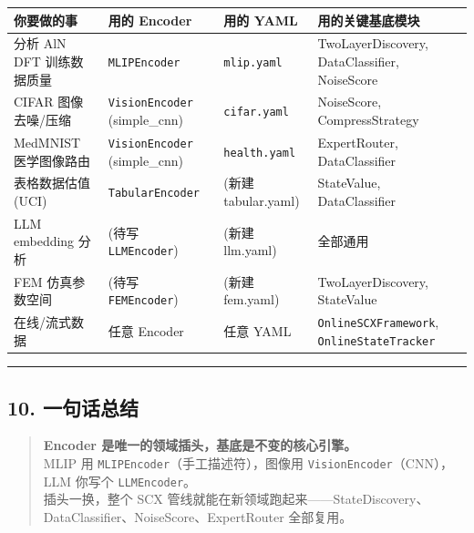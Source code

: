 \documentclass[
  12pt,
]{ctexart}
\begin{document}
\begin{longtable}[]{@{}
  >{\raggedright\arraybackslash}p{}
  >{\raggedright\arraybackslash}p{}
  >{\raggedright\arraybackslash}p{}
  >{\raggedright\arraybackslash}p{}@{}}
\toprule\noalign{}
\begin{minipage}[b]{\linewidth}\raggedright
你要做的事
\end{minipage} & \begin{minipage}[b]{\linewidth}\raggedright
用的 Encoder
\end{minipage} & \begin{minipage}[b]{\linewidth}\raggedright
用的 YAML
\end{minipage} & \begin{minipage}[b]{\linewidth}\raggedright
用的关键基底模块
\end{minipage} \\
\midrule\noalign{}
\endhead
\bottomrule\noalign{}
\endlastfoot
分析 AlN DFT 训练数据质量 & \texttt{MLIPEncoder} & \texttt{mlip.yaml} &
TwoLayerDiscovery, DataClassifier, NoiseScore \\
CIFAR 图像去噪/压缩 & \texttt{VisionEncoder} (simple\_cnn) &
\texttt{cifar.yaml} & NoiseScore, CompressStrategy \\
MedMNIST 医学图像路由 & \texttt{VisionEncoder} (simple\_cnn) &
\texttt{health.yaml} & ExpertRouter, DataClassifier \\
表格数据估值 (UCI) & \texttt{TabularEncoder} & (新建 tabular.yaml) &
StateValue, DataClassifier \\
LLM embedding 分析 & (待写 \texttt{LLMEncoder}) & (新建 llm.yaml) &
全部通用 \\
FEM 仿真参数空间 & (待写 \texttt{FEMEncoder}) & (新建 fem.yaml) &
TwoLayerDiscovery, StateValue \\
在线/流式数据 & 任意 Encoder & 任意 YAML & \texttt{OnlineSCXFramework},
\texttt{OnlineStateTracker} \\
\end{longtable}

\begin{center}\rule{0.5\linewidth}{0.5pt}\end{center}

\subsection{10. 一句话总结}\label{ux4e00ux53e5ux8bddux603bux7ed3}

\begin{quote}
\textbf{Encoder 是唯一的领域插头，基底是不变的核心引擎。}\\
MLIP 用 \texttt{MLIPEncoder}（手工描述符），图像用
\texttt{VisionEncoder}（CNN），LLM 你写个 \texttt{LLMEncoder}。\\
插头一换，整个 SCX
管线就能在新领域跑起来------StateDiscovery、DataClassifier、NoiseScore、ExpertRouter
全部复用。
\end{quote}
\end{document}
